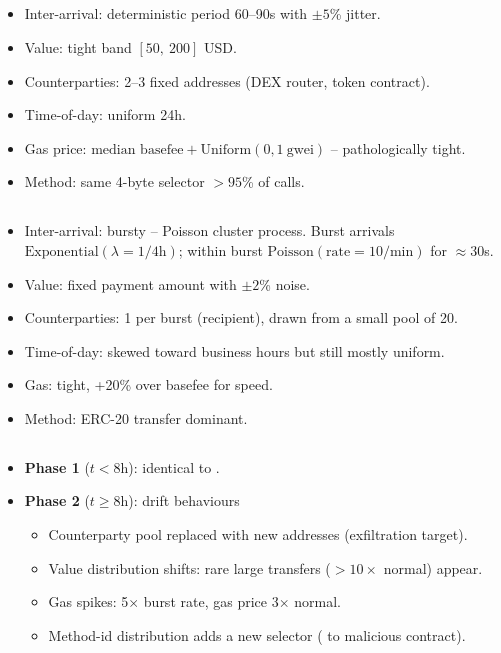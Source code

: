 \documentclass[11pt]{article}
\begin{document}
\subsection*{}
\begin{itemize}
  \item Inter-arrival: deterministic period 60--90s with $\pm 5$\% jitter.
  \item Value: tight band $[50,\ 200]$ USD.
  \item Counterparties: 2--3 fixed addresses (DEX router, token contract).
  \item Time-of-day: uniform 24h.
  \item Gas price: $\text{median basefee} + \mathrm{Uniform}(0, 1\ \text{gwei})$
    -- pathologically tight.
  \item Method: same 4-byte selector $>95$\% of calls.
\end{itemize}

\subsection*{}
\begin{itemize}
  \item Inter-arrival: bursty -- Poisson cluster process. Burst arrivals
    $\mathrm{Exponential}(\lambda=1/4\text{h})$; within burst
    $\mathrm{Poisson}(\text{rate}=10/\text{min})$ for $\approx 30$s.
  \item Value: fixed payment amount with $\pm 2$\% noise.
  \item Counterparties: 1 per burst (recipient), drawn from a small pool of 20.
  \item Time-of-day: skewed toward business hours but still mostly uniform.
  \item Gas: tight, +20\% over basefee for speed.
  \item Method: ERC-20 transfer dominant.
\end{itemize}

\subsection*{}
\begin{itemize}
  \item \textbf{Phase 1} ($t < 8$h): identical to .
  \item \textbf{Phase 2} ($t \geq 8$h): drift behaviours
  \begin{itemize}
    \item Counterparty pool replaced with new addresses (exfiltration target).
    \item Value distribution shifts: rare large transfers ($>10\times$ normal)
      appear.
    \item Gas spikes: 5$\times$ burst rate, gas price 3$\times$ normal.
    \item Method-id distribution adds a new selector ( to
      malicious contract).
  \end{itemize}
\end{itemize}
\end{document}
